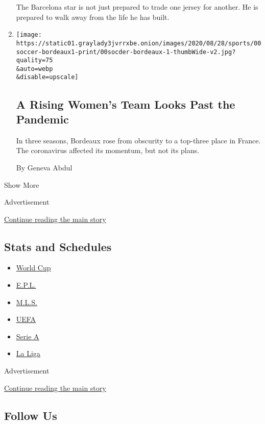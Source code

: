 \begin{enumerate}
  The Barcelona star is not just prepared to trade one jersey for
  another. He is prepared to walk away from the life he has built.
\item
  \href{/2020/08/27/sports/soccer/womens-champions-league.html}{}

  \texttt{[image: https://static01.graylady3jvrrxbe.onion/images/2020/08/28/sports/00soccer-bordeaux1-print/00socder-bordeaux-1-thumbWide-v2.jpg?quality=75\\\&auto=webp\\\&disable=upscale]}

  \hypertarget{a-rising-womens-team-looks-past-the-pandemic}{%
  \subsection{A Rising Women's Team Looks Past the
  Pandemic}\label{a-rising-womens-team-looks-past-the-pandemic}}

  In three seasons, Bordeaux rose from obscurity to a top-three place in
  France. The coronavirus affected its momentum, but not its plans.

  By Geneva Abdul
\end{enumerate}

Show More

Advertisement

\protect\hyperlink{after-mid1}{Continue reading the main story}

\hypertarget{stats-and-schedules}{%
\subsection{Stats and Schedules}\label{stats-and-schedules}}

\begin{itemize}
\tightlist
\item
  \protect\hyperlink{}{World Cup}
\item
  \protect\hyperlink{}{E.P.L.}
\item
  \protect\hyperlink{}{M.L.S.}
\item
  \protect\hyperlink{}{UEFA}
\item
  \protect\hyperlink{}{Serie A}
\item
  \protect\hyperlink{}{La Liga}
\end{itemize}

Advertisement

\protect\hyperlink{after-mktg}{Continue reading the main story}

\hypertarget{follow-us}{%
\subsection{Follow Us}\label{follow-us}}

